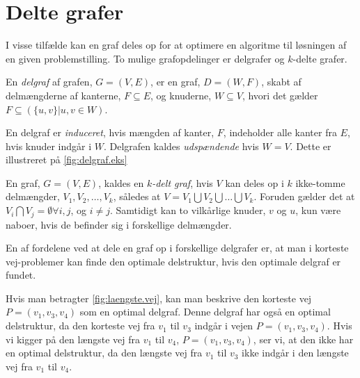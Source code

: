\section{Delte grafer}
I visse tilfælde kan en graf deles op for at optimere en algoritme til løsningen af en given problemstilling.
To mulige grafopdelinger er delgrafer og $k$-delte grafer.

\begin{defn}[Delgraf] \label{defn:delgraf} %
En \emph{delgraf} af grafen, $G= (V,E)$, er en graf, $D = (W,F)$, skabt af delmængderne af kanterne, $F \subseteq E$, og knuderne, $W \subseteq V$, hvori det gælder $F \subseteq (\{u,v\} | u,v \in W)$.
\end{defn}

En delgraf er \emph{induceret}, hvis mængden af kanter, $F$, indeholder alle kanter fra $E$, hvis knuder indgår i $W$.
Delgrafen kaldes \emph{udspændende} hvis $W=V$. Dette er illustreret på \autoref{fig:delgraf.eks}



\begin{defn} \label{defn:k-delt} %
En graf, $G = (V, E)$, kaldes en \emph{$k$-delt graf}, hvis $V$ kan deles op i $k$ ikke-tomme delmængder, $V_1, V_2,\dotsc, V_k$, således at $V= V_1 \bigcup V_2 \bigcup \dotsc \bigcup V_k$. Foruden gælder det at $V_i \bigcap V_j  = \emptyset \forall i,j$, og $i\neq j$. Samtidigt kan to vilkårlige knuder, $v$ og $u$, kun være naboer, hvis de befinder sig i forskellige delmængder. 
\end{defn}


En af fordelene ved at dele en graf op i forskellige delgrafer er, at man i korteste vej-problemer kan finde den optimale delstruktur, hvis den optimale delgraf er fundet. 

Hvis man betragter \autoref{fig:laengste.vej}, kan man beskrive den korteste vej $P=(v_1,v_3,v_4)$ som en optimal delgraf. Denne delgraf har også en optimal delstruktur, da den korteste vej fra $v_1$ til $v_3$ indgår i vejen $P=(v_1,v_3,v_4)$.
Hvis vi kigger på den længste vej fra $v_1$ til $v_4$, $P=(v_1,v_3,v_4)$, ser vi, at den ikke har en optimal delstruktur, da den længste vej fra $v_1$ til $v_3$ ikke indgår i den længste vej fra $v_1$ til $v_4$.








